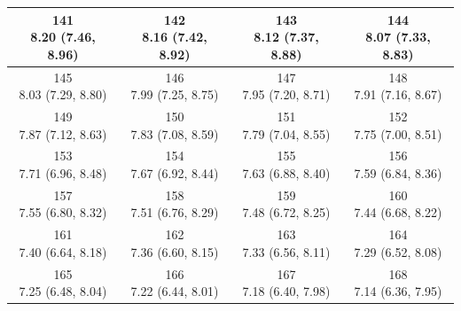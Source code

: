 \begin{table}[htbp]
\begin{tabular}{cccc}
\hline
\shortstack[c]{141\\8.20 (7.46, 8.96)} & \shortstack[c]{142\\8.16 (7.42, 8.92)} & \shortstack[c]{143\\8.12 (7.37, 8.88)} & \shortstack[c]{144\\8.07 (7.33, 8.83)} \\
\hline
\shortstack[c]{145\\8.03 (7.29, 8.80)} & \shortstack[c]{146\\7.99 (7.25, 8.75)} & \shortstack[c]{147\\7.95 (7.20, 8.71)} & \shortstack[c]{148\\7.91 (7.16, 8.67)} \\
\hline
\shortstack[c]{149\\7.87 (7.12, 8.63)} & \shortstack[c]{150\\7.83 (7.08, 8.59)} & \shortstack[c]{151\\7.79 (7.04, 8.55)} & \shortstack[c]{152\\7.75 (7.00, 8.51)} \\
\hline
\shortstack[c]{153\\7.71 (6.96, 8.48)} & \shortstack[c]{154\\7.67 (6.92, 8.44)} & \shortstack[c]{155\\7.63 (6.88, 8.40)} & \shortstack[c]{156\\7.59 (6.84, 8.36)} \\
\hline
\shortstack[c]{157\\7.55 (6.80, 8.32)} & \shortstack[c]{158\\7.51 (6.76, 8.29)} & \shortstack[c]{159\\7.48 (6.72, 8.25)} & \shortstack[c]{160\\7.44 (6.68, 8.22)} \\
\hline
\shortstack[c]{161\\7.40 (6.64, 8.18)} & \shortstack[c]{162\\7.36 (6.60, 8.15)} & \shortstack[c]{163\\7.33 (6.56, 8.11)} & \shortstack[c]{164\\7.29 (6.52, 8.08)} \\
\hline
\shortstack[c]{165\\7.25 (6.48, 8.04)} & \shortstack[c]{166\\7.22 (6.44, 8.01)} & \shortstack[c]{167\\7.18 (6.40, 7.98)} & \shortstack[c]{168\\7.14 (6.36, 7.95)} \\

\end{tabular}
\end{table}
